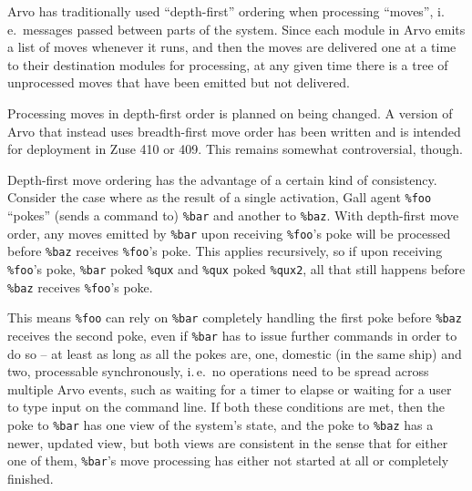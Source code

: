\documentclass[twoside]{article}
\begin{document}
Arvo has traditionally used ``depth-first'' ordering when processing ``moves'', i.\,e.\ messages passed between parts of the system.  Since each module in Arvo emits a list of moves whenever it runs, and then the moves are delivered one at a time to their destination modules for processing, at any given time there is a tree of unprocessed moves that have been emitted but not delivered.

Processing moves in depth-first order is planned on being changed.  A version of Arvo that instead uses breadth-first move order has been written and is intended for deployment in Zuse 410 or 409.  This remains somewhat controversial, though.

Depth-first move ordering has the advantage of a certain kind of consistency.  Consider the case where as the result of a single activation, Gall agent \lstinline[style=inlinecode]{%foo} ``pokes'' (sends a command to) \lstinline[style=inlinecode]{%bar} and another to \lstinline[style=inlinecode]{%baz}.  With depth-first move order, any moves emitted by \lstinline[style=inlinecode]{%bar} upon receiving \lstinline[style=inlinecode]{%foo}'s poke will be processed before \lstinline[style=inlinecode]{%baz} receives \lstinline[style=inlinecode]{%foo}'s poke.  This applies recursively, so if upon receiving \lstinline[style=inlinecode]{%foo}'s poke, \lstinline[style=inlinecode]{%bar} poked \lstinline[style=inlinecode]{%qux} and \lstinline[style=inlinecode]{%qux} poked \lstinline[style=inlinecode]{%qux2}, all that still happens before \lstinline[style=inlinecode]{%baz} receives \lstinline[style=inlinecode]{%foo}'s poke.

This means \lstinline[style=inlinecode]{%foo} can rely on \lstinline[style=inlinecode]{%bar} completely handling the first poke before \lstinline[style=inlinecode]{%baz} receives the second poke, even if \lstinline[style=inlinecode]{%bar} has to issue further commands in order to do so – at least as long as all the pokes are, one, domestic (in the same ship) and two, processable synchronously, i.\,e.\ no operations need to be spread across multiple Arvo events, such as waiting for a timer to elapse or waiting for a user to type input on the command line.  If both these conditions are met, then the poke to \lstinline[style=inlinecode]{%bar} has one view of the system's state, and the poke to \lstinline[style=inlinecode]{%baz} has a newer, updated view, but both views are consistent in the sense that for either one of them, \lstinline[style=inlinecode]{%bar}'s move processing has either not started at all or completely finished.
\end{document}
